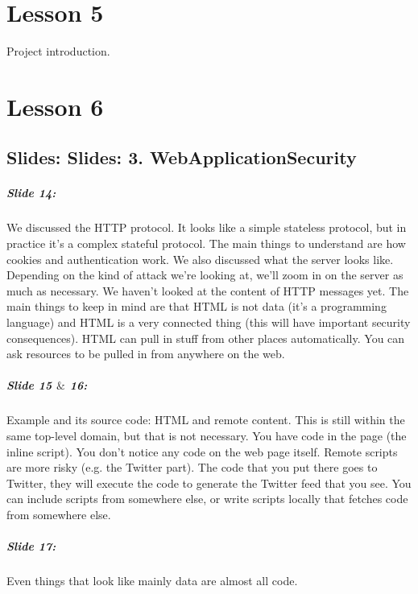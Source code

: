 \documentclass[10pt,a4paper]{report}
\begin{document}
\chapter{Lesson 5}
Project introduction.

\chapter{Lesson 6}
\section{Slides: Slides: 3. WebApplicationSecurity}

\paragraph{Slide 14:} We discussed the HTTP protocol. It looks like a simple stateless protocol, but in practice it's a complex stateful protocol. The main things to understand are how cookies and authentication work. We also discussed what the server looks like. Depending on the kind of attack we're looking at, we'll zoom in on the server as much as necessary. We haven't looked at the content of HTTP messages yet. The main things to keep in mind are that HTML is not data (it's a programming language) and HTML is a very connected thing (this will have important security consequences). HTML can pull in stuff from other places automatically. You can ask resources to be pulled in from anywhere on the web. 

\paragraph{Slide 15 $\&$ 16:} Example and its source code: HTML and remote content. This is still within the same top-level domain, but that is not necessary. You have code in the page (the inline script). You don't notice any code on the web page itself. Remote scripts are more risky (e.g. the Twitter part). The code that you put there goes to Twitter, they will execute the code to generate the Twitter feed that you see. You can include scripts from somewhere else, or write scripts locally that fetches code from somewhere else. 

\paragraph{Slide 17:} Even things that look like mainly data are almost all code. 
\end{document}
